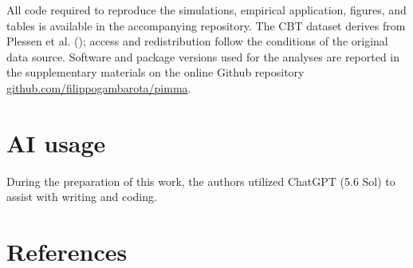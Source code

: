 \documentclass[
  man,
  longtable,
  nolmodern,
  notxfonts,
  notimes,
  colorlinks=true,linkcolor=blue,citecolor=blue,urlcolor=blue]{apa7}
\begin{document}
All code required to reproduce the simulations, empirical application,
figures, and tables is available in the accompanying repository. The CBT
dataset derives from Plessen et al.
(); access and redistribution follow
the conditions of the original data source. Software and package
versions used for the analyses are reported in the supplementary
materials on the online Github repository
\href{https://github.com/filippogambarota/pimma}{github.com/filippogambarota/pimma}.

\section{AI usage}\label{ai-usage}

During the preparation of this work, the authors utilized ChatGPT (5.6
Sol) to assist with writing and coding.

\section{References}\label{references}
\end{document}
